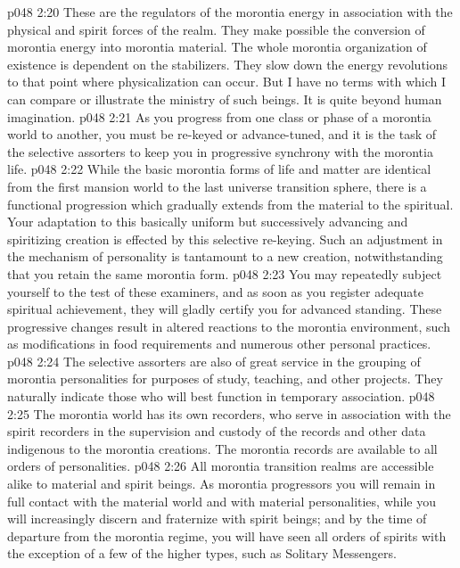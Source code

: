 \pc \vs p048 2:20 \bibnobreakspace {} These are the regulators of the morontia energy in association with the physical and spirit forces of the realm. They make possible the conversion of morontia energy into morontia material. The whole morontia organization of existence is dependent on the stabilizers. They slow down the energy revolutions to that point where physicalization can occur. But I have no terms with which I can compare or illustrate the ministry of such beings. It is quite beyond human imagination.
\pc \vs p048 2:21 \bibnobreakspace {} As you progress from one class or phase of a morontia world to another, you must be re\hyp{}keyed or advance\hyp{}tuned, and it is the task of the selective assorters to keep you in progressive synchrony with the morontia life.
\vs p048 2:22 While the basic morontia forms of life and matter are identical from the first mansion world to the last universe transition sphere, there is a functional progression which gradually extends from the material to the spiritual. Your adaptation to this basically uniform but successively advancing and spiritizing creation is effected by this selective re\hyp{}keying. Such an adjustment in the mechanism of personality is tantamount to a new creation, notwithstanding that you retain the same morontia form.
\vs p048 2:23 You may repeatedly subject yourself to the test of these examiners, and as soon as you register adequate spiritual achievement, they will gladly certify you for advanced standing. These progressive changes result in altered reactions to the morontia environment, such as modifications in food requirements and numerous other personal practices.
\vs p048 2:24 The selective assorters are also of great service in the grouping of morontia personalities for purposes of study, teaching, and other projects. They naturally indicate those who will best function in temporary association.
\pc \vs p048 2:25 \bibnobreakspace {} The morontia world has its own recorders, who serve in association with the spirit recorders in the supervision and custody of the records and other data indigenous to the morontia creations. The morontia records are available to all orders of personalities.
\vs p048 2:26 All morontia transition realms are accessible alike to material and spirit beings. As morontia progressors you will remain in full contact with the material world and with material personalities, while you will increasingly discern and fraternize with spirit beings; and by the time of departure from the morontia regime, you will have seen all orders of spirits with the exception of a few of the higher types, such as Solitary Messengers.
